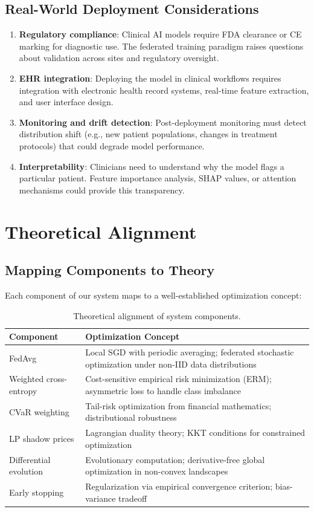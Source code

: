 \documentclass[11pt,a4paper]{report}
\begin{document}
\section{Real-World Deployment Considerations}

\begin{enumerate}[leftmargin=2em]
\item \textbf{Regulatory compliance}: Clinical AI models require FDA clearance or CE marking for diagnostic use. The federated training paradigm raises questions about validation across sites and regulatory oversight.
\item \textbf{EHR integration}: Deploying the model in clinical workflows requires integration with electronic health record systems, real-time feature extraction, and user interface design.
\item \textbf{Monitoring and drift detection}: Post-deployment monitoring must detect distribution shift (e.g., new patient populations, changes in treatment protocols) that could degrade model performance.
\item \textbf{Interpretability}: Clinicians need to understand why the model flags a particular patient. Feature importance analysis, SHAP values, or attention mechanisms could provide this transparency.
\end{enumerate}


\chapter{Theoretical Alignment}

\section{Mapping Components to Theory}

Each component of our system maps to a well-established optimization concept:

\begin{table}[H]
\centering
\caption{Theoretical alignment of system components.}
\label{tab:theory}
\begin{tabular}{p{4cm}p{9cm}}
\toprule
\textbf{Component} & \textbf{Optimization Concept} \\
\midrule
FedAvg & Local SGD with periodic averaging; federated stochastic optimization under non-IID data distributions \\
Weighted cross-entropy & Cost-sensitive empirical risk minimization (ERM); asymmetric loss to handle class imbalance \\
CVaR weighting & Tail-risk optimization from financial mathematics; distributional robustness \\
LP shadow prices & Lagrangian duality theory; KKT conditions for constrained optimization \\
Differential evolution & Evolutionary computation; derivative-free global optimization in non-convex landscapes \\
Early stopping & Regularization via empirical convergence criterion; bias-variance tradeoff \\
\bottomrule
\end{tabular}
\end{table}
\end{document}
